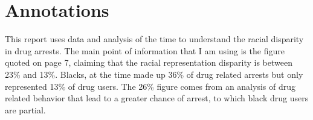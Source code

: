 \documentclass[11pt]{article}
\begin{document}
\pagebreak
\nocite{*}
\hypertarget{references}{%
\printbibliography\label{references}}

\hypertarget{annotations}{%
\section*{Annotations}\label{annotations}}

\cite{bjs}This report uses data and analysis of the time to understand the racial disparity in drug arrests. The main point of information that I am using is the figure quoted on page 7, claiming that the racial representation disparity is between 23\% and 13\%. Blacks, at the time made up 36\% of drug related arrests but only represented 13\% of drug users. The 26\% figure comes from an analysis of drug related behavior that lead to a greater chance of arrest, to which black drug users are partial. 
\end{document}
